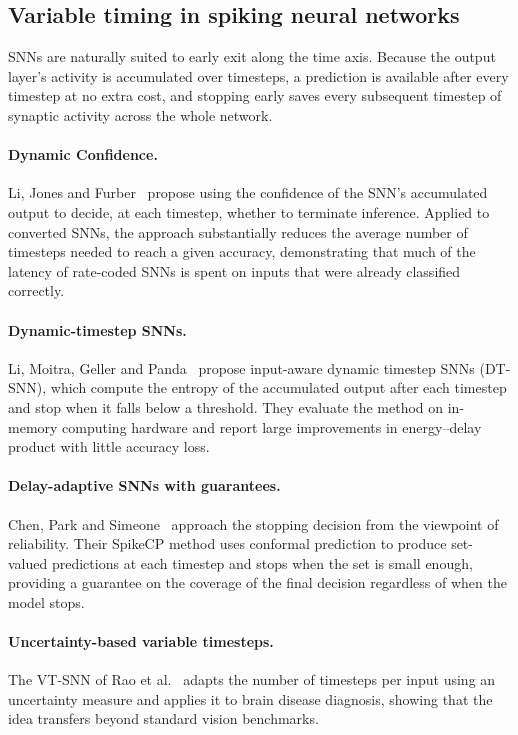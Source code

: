 \subsection{Variable timing in spiking neural networks}

SNNs are naturally suited to early exit along the time axis. Because the output layer's activity is accumulated over timesteps, a prediction is available after every timestep at no extra cost, and stopping early saves every subsequent timestep of synaptic activity across the whole network.

\paragraph{Dynamic Confidence.} Li, Jones and Furber~\cite{li2023unleashing} propose using the confidence of the SNN's accumulated output to decide, at each timestep, whether to terminate inference. Applied to converted SNNs, the approach substantially reduces the average number of timesteps needed to reach a given accuracy, demonstrating that much of the latency of rate-coded SNNs is spent on inputs that were already classified correctly.

\paragraph{Dynamic-timestep SNNs.} Li, Moitra, Geller and Panda~\cite{li2023input} propose input-aware dynamic timestep SNNs (DT-SNN), which compute the entropy of the accumulated output after each timestep and stop when it falls below a threshold. They evaluate the method on in-memory computing hardware and report large improvements in energy--delay product with little accuracy loss.

\paragraph{Delay-adaptive SNNs with guarantees.} Chen, Park and Simeone~\cite{chen2025knowing} approach the stopping decision from the viewpoint of reliability. Their SpikeCP method uses conformal prediction to produce set-valued predictions at each timestep and stops when the set is small enough, providing a guarantee on the coverage of the final decision regardless of when the model stops.

\paragraph{Uncertainty-based variable timesteps.} The VT-SNN of Rao et al.~\cite{rao2025vtsnn} adapts the number of timesteps per input using an uncertainty measure and applies it to brain disease diagnosis, showing that the idea transfers beyond standard vision benchmarks.

